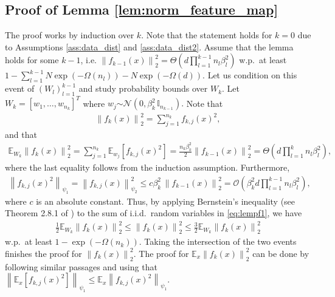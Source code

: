\documentclass[11pt]{article}
\newcommand{\E}{\mathbb{E}}
\newcommand{\distas}[1]{\mathbin{\overset{#1}{\sim}}}
\newenvironment{proof}{\par\noindent{\bf Proof:\ }}{\hfill$\Box$\\[2mm]}
\newcommand{\Id}{\mathbb{I}}
\newcommand{\bigO}[1]{\mathcal{O}\left(#1\right)}
\newcommand{\bigOmg}[1]{\Omega\left(#1\right)}
\newcommand{\bigTheta}[1]{\Theta\left(#1\right)}
\newcommand{\bigexp}[1]{\exp\left(#1\right)}
\newcommand{\norm}[1]{\left\|#1\right\|}
\def\Bernstein{Theorem 2.8.1 of \cite{vershynin2018high}}
\begin{document}
\subsection{Proof of Lemma \ref{lem:norm_feature_map}}
    The proof works by induction over $k.$
    Note that the statement holds for $k=0$ due to Assumptions \ref{ass:data_dist} and \ref{ass:data_dist2}.
    Assume that the lemma holds for some $k-1$,
    i.e. $\norm{f_{k-1}(x)}_2^2=\bigTheta{d\prod_{l=1}^{k-1}n_l\beta_l^2}$ w.p.\ at least $ 1-\sum_{l=1}^{k-1} N\bigexp{-\bigOmg{n_l}}-N\bigexp{-\bigOmg{d}}.$
    Let us condition on this event of $(W_l)_{l=1}^{k-1}$ and study probability bounds over $W_k.$
    Let $W_k=[w_1,\ldots,w_{n_k}]^T$ where $w_j\distas{}\mathcal{N}(0, \beta_k^2\,\Id_{n_{k-1}}).$
    Note that
    \begin{align}\label{eq:lempf1}
	\norm{f_k(x)}_2^2=\sum_{j=1}^{n_k} f_{k,j}(x)^2,
    \end{align}
and that
    \begin{align*}
	\E_{W_k} \norm{f_k(x)}_2^2
	= \sum_{j=1}^{n_k} \E_{w_j}[f_{k,j}(x)^2]
	= \frac{n_k\beta_k^2}{2}\norm{f_{k-1}(x)}_2^2
	= \bigTheta{d\prod_{l=1}^{k}n_l\beta_l^2} ,
    \end{align*}
where the last equality follows from the induction assumption. Furthermore,
    \begin{align*}
	\norm{f_{k,j}(x)^2}_{\psi_1}
	= \norm{f_{k,j}(x)}_{\psi_2}^2 
	\le c \beta_k^2\, \norm{f_{k-1}(x)}_2^2 
	=\bigO{\beta_k^2 d\prod_{l=1}^{k-1}n_l\beta_l^2} ,
    \end{align*}
    where $c$ is an absolute constant.
    Thus, by applying Bernstein's inequality (see \Bernstein) to the sum of i.i.d.\ random variables in \eqref{eq:lempf1}, we have
    \begin{align*}
	\frac{1}{2} \E_{W_k} \norm{f_k(x)}_2^2 \leq \norm{f_k(x)}_2^2 \leq \frac{3}{2} \E_{W_k} \norm{f_k(x)}_2^2
    \end{align*}
    w.p.\ at least $1-\bigexp{-\bigOmg{n_k}}.$ 
    Taking the intersection of the two events finishes the proof for $\norm{f_k(x)}_2^2.$
    The proof for $\E_x\norm{f_k(x)}_2^2$ can be done by following similar passages and using that $\norm{\E_x[f_{k,j}(x)^2]}_{\psi_1}\leq\E_x\norm{f_{k,j}(x)^2}_{\psi_1}$.
\end{document}
